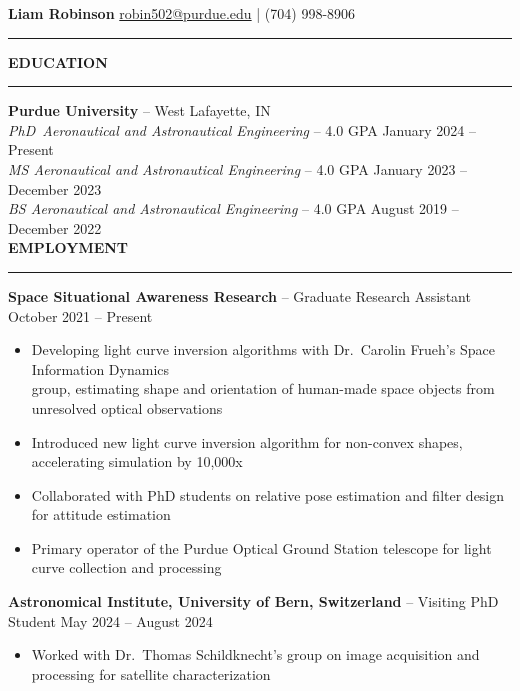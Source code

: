 \documentclass[11pt, a4paper]{article}
\newcommand{\sectiontitle}[1]{{\Large \textbf{#1}}\vspace{0.5em}\hrule\vspace{0.5em}}
\begin{document}
\thispagestyle{empty}

\sffamily
\renewcommand*{\bibfont}{\normalfont\normalsize\sffamily}

\noindent
\textbf{\huge Liam Robinson} \hfill \href{mailto:robin502@purdue.edu}{robin502@purdue.edu} | (704) 998-8906
\rule{\linewidth}{4pt}
\vspace{-0.5em}

\sectiontitle{EDUCATION}
\textbf{Purdue University} -- West Lafayette, IN \\
\textit{PhD\ Aeronautical and Astronautical Engineering} -- 4.0 GPA \hfill January 2024 -- Present \\
\textit{MS \hspace{1px} Aeronautical and Astronautical Engineering} -- 4.0 GPA \hfill January 2023 -- December 2023 \\
\textit{BS \hspace{3px} Aeronautical and Astronautical Engineering} -- 4.0 GPA \hfill August 2019 -- December 2022 \\

\sectiontitle{EMPLOYMENT}
\textbf{Space Situational Awareness Research} -- Graduate Research Assistant \hfill October 2021 -- Present
\begin{itemize}[noitemsep]
    \item Developing light curve inversion algorithms with Dr.\ Carolin Frueh's Space Information Dynamics \\group, estimating shape and orientation of human-made space objects from unresolved optical observations
    \item Introduced new light curve inversion algorithm for non-convex shapes, accelerating simulation by 10,000x
    \item Collaborated with PhD students on relative pose estimation and filter design for attitude estimation
    \item Primary operator of the Purdue Optical Ground Station telescope for light curve collection and processing
\end{itemize}

\textbf{Astronomical Institute, University of Bern, Switzerland} -- Visiting PhD Student \hfill May 2024 -- August 2024
\begin{itemize}[noitemsep]
    \item Worked with Dr.\ Thomas Schildknecht's group on image acquisition and processing for satellite characterization
\end{itemize}
\end{document}
